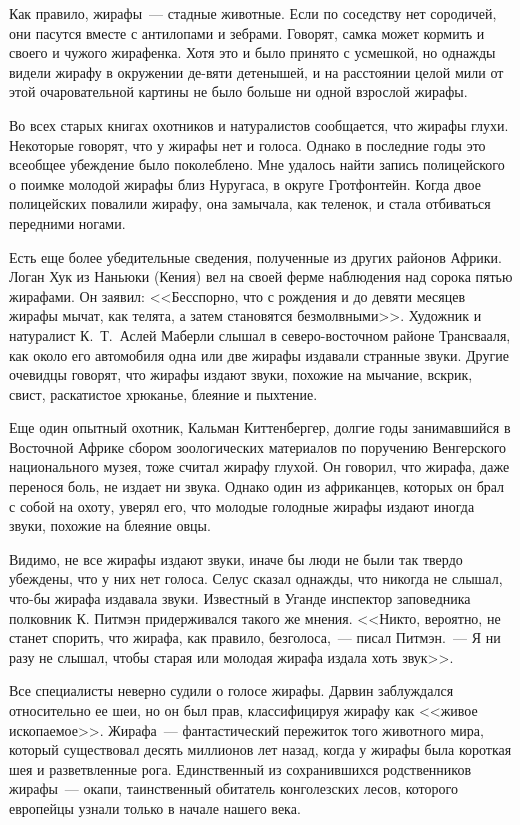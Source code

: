\documentclass[12pt,a4paper,twoside,openany,svgnames]{memoir}
\begin{document}
Как правило, жирафы~--- стадные животные. Если по соседству нет сородичей, они пасутся вместе с антилопами и зебрами. Говорят, самка может кормить и своего и чужого жирафенка. Хотя это и было принято с усмешкой, но однажды видели жирафу в окружении де-вяти детенышей, и на расстоянии целой мили от этой очаровательной картины не было больше ни одной взрослой жирафы.

Во всех старых книгах охотников и натуралистов сообщается, что жирафы глухи. Некоторые говорят, что у жирафы нет и голоса. Однако в последние годы это всеобщее убеждение было поколеблено. Мне удалось найти запись полицейского о поимке молодой жирафы близ Нуругаса, в округе Гротфонтейн. Когда двое полицейских повалили жирафу, она замычала, как теленок, и стала отбиваться передними ногами.

Есть еще более убедительные сведения, полученные из других районов Африки. Логан Хук из Наньюки (Кения) вел на своей ферме наблюдения над сорока пятью жирафами. Он заявил: <<Бесспорно, что с рождения и до девяти месяцев жирафы мычат, как телята, а затем становятся безмолвными>>. Художник и натуралист К.~Т.~Аслей Маберли слышал в северо-восточном районе Трансвааля, как около его автомобиля одна или две жирафы издавали странные звуки. Другие очевидцы говорят, что жирафы издают звуки, похожие на мычание, вскрик, свист, раскатистое хрюканье, блеяние и пыхтение.

Еще один опытный охотник, Кальман Киттенбергер, долгие годы занимавшийся в Восточной Африке сбором зоологических материалов по поручению Венгерского национального музея, тоже считал жирафу глухой. Он говорил, что жирафа, даже перенося боль, не издает ни звука. Однако один из африканцев, которых он брал с собой на охоту, уверял его, что молодые голодные жирафы издают иногда звуки, похожие на блеяние овцы.

Видимо, не все жирафы издают звуки, иначе бы люди не были так твердо убеждены, что у них нет голоса. Селус сказал однажды, что никогда не слышал, что-бы жирафа издавала звуки. Известный в Уганде инспектор заповедника полковник К. Питмэн придерживался такого же мнения. <<Никто, вероятно, не станет спорить, что жирафа, как правило, безголоса,~--- писал Питмэн.~--- Я ни разу не слышал, чтобы старая или молодая жирафа издала хоть звук>>.

Все специалисты неверно судили о голосе жирафы. Дарвин заблуждался относительно ее шеи, но он был прав, классифицируя жирафу как <<живое ископаемое>>. Жирафа~--- фантастический пережиток того животного мира, который существовал десять миллионов лет назад, когда у жирафы была короткая шея и разветвленные рога. Единственный из сохранившихся родственников жирафы~--- окапи, таинственный обитатель конголезских лесов, которого европейцы узнали только в начале нашего века.
\end{document}
